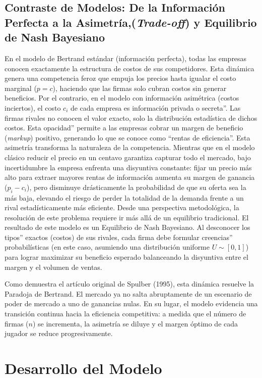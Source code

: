 \documentclass[12pt]{article}
\begin{document}
\subsection{Contraste de Modelos: De la Información Perfecta a la Asimetría,(\textit{Trade-off}) y Equilibrio de Nash Bayesiano}
En el modelo de Bertrand estándar (información perfecta), todas las empresas conocen exactamente la estructura de costos de sus competidores. Esta dinámica genera una competencia feroz que empuja los precios hasta igualar el costo marginal ($p = c$), haciendo que las firmas solo cubran costos sin generar beneficios. Por el contrario, en el modelo con información asimétrica (costos inciertos), el costo $c_i$ de cada empresa es información privada o secreta''. Las firmas rivales no conocen el valor exacto, solo la distribución estadística de dichos costos. Esta opacidad'' permite a las empresas cobrar un margen de beneficio (\textit{markup}) positivo, generando lo que se conoce como ``rentas de eficiencia''.
Esta asimetría transforma la naturaleza de la competencia. Mientras que en el modelo clásico reducir el precio en un centavo garantiza capturar todo el mercado, bajo incertidumbre la empresa enfrenta una disyuntiva constante: fijar un precio más alto para extraer mayores rentas de información aumenta su margen de ganancia ($p_i - c_i$), pero disminuye drásticamente la probabilidad de que su oferta sea la más baja, elevando el riesgo de perder la totalidad de la demanda frente a un rival estadísticamente más eficiente.
Desde una perspectiva metodológica, la resolución de este problema requiere ir más allá de un equilibrio tradicional. El resultado de este modelo es un Equilibrio de Nash Bayesiano. Al desconocer los tipos'' exactos (costos) de sus rivales, cada firma debe formular creencias'' probabilísticas (en este caso, asumiendo una distribución uniforme $U \sim [0,1]$) para lograr maximizar su beneficio esperado balanceando la disyuntiva entre el margen y el volumen de ventas.

Como demuestra el artículo original de Spulber (1995), esta dinámica resuelve la Paradoja de Bertrand. El mercado ya no salta abruptamente de un escenario de poder de mercado a uno de ganancias nulas. En su lugar, el modelo evidencia una transición continua hacia la eficiencia competitiva: a medida que el número de firmas ($n$) se incrementa, la asimetría se diluye y el margen óptimo de cada jugador se reduce progresivamente.

\section{Desarrollo del Modelo}
\end{document}
